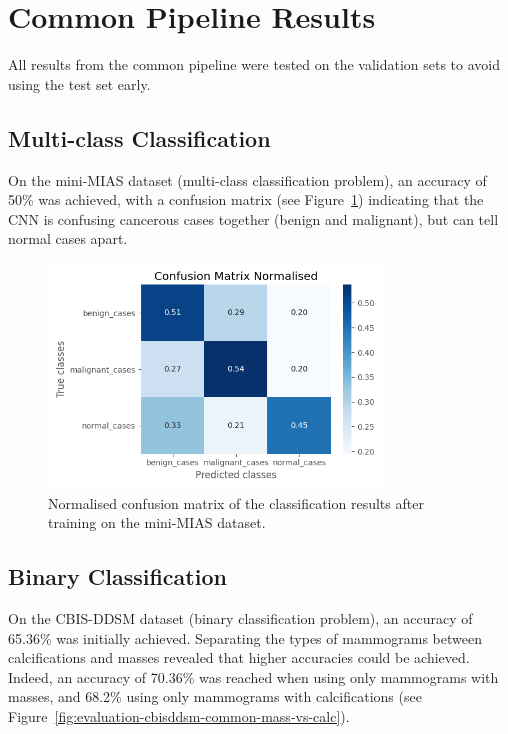 \section{Common Pipeline Results}

All results from the common pipeline were tested on the validation sets to avoid using the test set early.

\subsection{Multi-class Classification}

On the mini-MIAS dataset (multi-class classification problem), an accuracy of 50\% was achieved, with a confusion matrix (see Figure~\ref{fig:evaluation-common-CM-norm_basic-model_mini-MIAS-dataset}) indicating that the CNN is confusing cancerous cases together (benign and malignant), but can tell normal cases apart.

\begin{figure}[ht]
\centerline{\includegraphics[width=0.8\textwidth]{Dissertation/figures/evaluation/common/CM-norm_basic-model_mini-MIAS-dataset.png}}
\caption{\label{fig:evaluation-common-CM-norm_basic-model_mini-MIAS-dataset}Normalised confusion matrix of the classification results after training on the mini-MIAS dataset.}
\end{figure}

\subsection{Binary Classification}

On the CBIS-DDSM dataset (binary classification problem), an accuracy of 65.36\% was initially achieved. Separating the types of mammograms between calcifications and masses revealed that higher accuracies could be achieved. Indeed, an accuracy of 70.36\% was reached when using only mammograms with masses, and 68.2\%  using only mammograms with calcifications (see Figure~\ref{fig:evaluation-cbisddsm-common-mass-vs-calc}).

